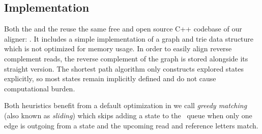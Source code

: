 \subsection{Implementation}

Both the \seedh and the \prefixh reuse the same free and open source C++
codebase of our \astarix aligner: \astarixurl. It includes a simple
implementation of a graph and trie data structure which is not optimized for
memory usage. In order to easily align reverse complement reads, the reverse
complement of the graph is stored alongside its straight version. The shortest
path algorithm only constructs explored states explicitly, so most states remain
implicitly defined and do not cause computational burden.

Both heuristics benefit from a default optimization in \astarix we call
\emph{greedy matching} (also known as \emph{sliding}) which skips adding a state
to the \A~queue when only one edge is outgoing from a state and the upcoming
read and reference letters match.